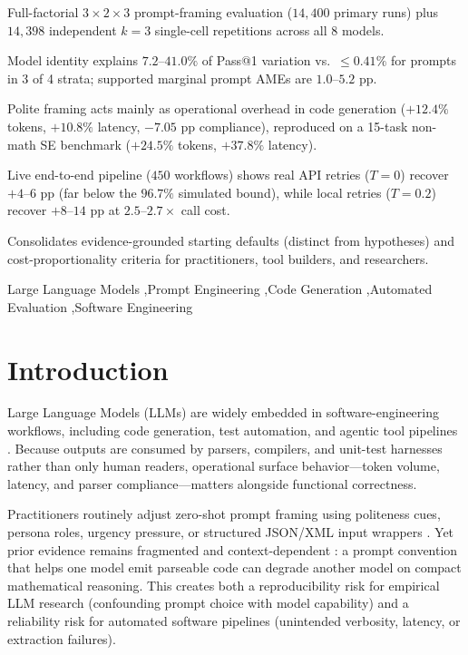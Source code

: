 \documentclass[a4paper,fleqn]{cas-sc}
\begin{document}
\begin{highlights}
\item Full-factorial $3 \times 2 \times 3$ prompt-framing evaluation ($14{,}400$ primary runs) plus $14{,}398$ independent $k = 3$ single-cell repetitions across all 8 models.
\item Model identity explains $7.2$--$41.0\%$ of Pass@1 variation vs.\ $\le 0.41\%$ for prompts in 3 of 4 strata; supported marginal prompt AMEs are $1.0$--$5.2$ pp.
\item Polite framing acts mainly as operational overhead in code generation ($+12.4\%$ tokens, $+10.8\%$ latency, $-7.05$ pp compliance), reproduced on a 15-task non-math SE benchmark ($+24.5\%$ tokens, $+37.8\%$ latency).
\item Live end-to-end pipeline ($450$ workflows) shows real API retries ($T = 0$) recover $+4$--$6$ pp (far below the $96.7\%$ simulated bound), while local retries ($T = 0.2$) recover $+8$--$14$ pp at $2.5$--$2.7\times$ call cost.
\item Consolidates evidence-grounded starting defaults (distinct from hypotheses) and cost-proportionality criteria for practitioners, tool builders, and researchers.
\end{highlights}

\begin{keywords}
Large Language Models \sep Prompt Engineering \sep Code Generation \sep Automated Evaluation \sep Software Engineering
\end{keywords}

\maketitle

\section{Introduction}\label{sec:introduction}

    Large Language Models (LLMs) are widely embedded in software-engineering workflows, including code generation, test automation, and agentic tool pipelines \citep{ouyang2022instructgpt, chen2021codex, jimenez2024swebench}. Because outputs are consumed by parsers, compilers, and unit-test harnesses rather than only human readers, operational surface behavior—token volume, latency, and parser compliance—matters alongside functional correctness.

    Practitioners routinely adjust zero-shot prompt framing using politeness cues, persona roles, urgency pressure, or structured JSON/XML input wrappers \citep{li2023emotionprompt,yin2024politeness,liu2024structuredoutput,he2024formatting}. Yet prior evidence remains fragmented and context-dependent \citep{zhao2021calibrate, lu2021fantastically, sclar2023spurious, zhuo2024prosa, hua2025promptartifact}: a prompt convention that helps one model emit parseable code can degrade another model on compact mathematical reasoning. This creates both a reproducibility risk for empirical LLM research (confounding prompt choice with model capability) and a reliability risk for automated software pipelines (unintended verbosity, latency, or extraction failures).
\end{document}
